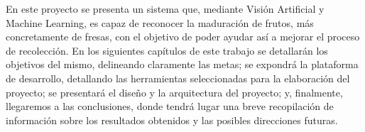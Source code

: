 En este proyecto se presenta un sistema que, mediante Visión Artificial y Machine Learning, es capaz de reconocer la maduración de frutos, más concretamente de fresas, con el objetivo de poder ayudar así a mejorar el proceso de recolección. En los siguientes capítulos de este trabajo se detallarán los objetivos del mismo, delineando claramente las metas; se expondrá la plataforma de desarrollo, detallando las herramientas seleccionadas para la elaboración del proyecto; se presentará el diseño y la arquitectura del proyecto; y, finalmente, llegaremos a las conclusiones, donde tendrá lugar una breve recopilación de información sobre los resultados obtenidos y las posibles direcciones futuras. 
